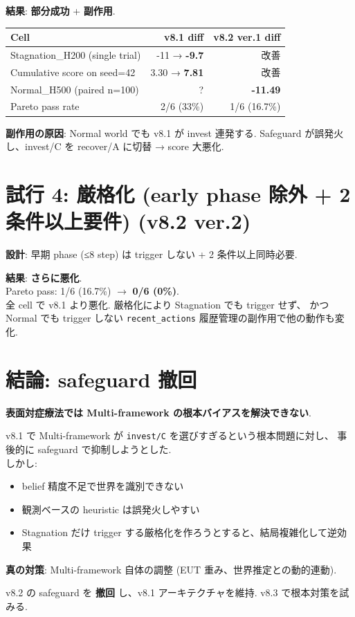 \documentclass[a4paper,11pt]{report}
\begin{document}
\textbf{結果}: \textbf{部分成功} + \textbf{副作用}.\\

\begin{tabular}{l r r}
\toprule
Cell & v8.1 diff & v8.2 ver.1 diff \\
\midrule
Stagnation\_H200 (single trial) & -11 → \textbf{-9.7} & 改善 \\
Cumulative score on seed=42 & 3.30 → \textbf{7.81} & 改善 \\
Normal\_H500 (paired n=100) & ? & \textcolor{warning}{\textbf{-11.49}} \\
Pareto pass rate & 2/6 (33\%) & 1/6 (16.7\%) \\
\bottomrule
\end{tabular}

\textbf{副作用の原因}: Normal world でも v8.1 が invest 連発する.
Safeguard が誤発火し、invest/C を recover/A に切替 → score 大悪化.

\section{試行 4: 厳格化 (early phase 除外 + 2 条件以上要件) (v8.2 ver.2)}

\textbf{設計}: 早期 phase (≤8 step) は trigger しない + 2 条件以上同時必要.

\textbf{結果}: \textbf{さらに悪化}.\\
Pareto pass: 1/6 (16.7\%) \(\rightarrow\) \textbf{0/6 (0\%)}.\\
全 cell で v8.1 より悪化. 厳格化により Stagnation でも trigger せず、
かつ Normal でも trigger しない \texttt{recent\_actions} 履歴管理の副作用で他の動作も変化.

\section{結論: safeguard 撤回}

\begin{honest}
\textbf{表面対症療法では Multi-framework の根本バイアスを解決できない}.

v8.1 で Multi-framework が \texttt{invest/C} を選びすぎるという根本問題に対し、
事後的に safeguard で抑制しようとした.\\
しかし:

\begin{itemize}[leftmargin=*]
  \item belief 精度不足で世界を識別できない
  \item 観測ベースの heuristic は誤発火しやすい
  \item Stagnation だけ trigger する厳格化を作ろうとすると、結局複雑化して逆効果
\end{itemize}

\textbf{真の対策}: Multi-framework 自体の調整 (EUT 重み、世界推定との動的連動).

v8.2 の safeguard を \textbf{撤回} し、v8.1 アーキテクチャを維持.
v8.3 で根本対策を試みる.
\end{honest}
\end{document}
